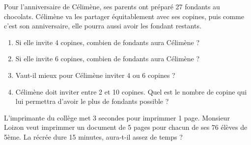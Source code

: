 \newpage


Pour l'anniversaire de Célimène, ses parents ont préparé 27 fondants au chocolats. Célimène va les partager équitablement avec ses copines, puis comme c'est son anniversaire, elle pourra aussi avoir les fondant restants.

\begin{enumerate}
	\item Si elle invite 4 copines, combien de fondants aura Célimène ?
	\item Si elle invite 6 copines, combien de fondants aura Célimène ?
	\item Vaut-il mieux pour Célimène inviter 4 ou 6 copines ?\dotfill
	\item Célimène doit inviter entre 2 et 10 copines. Quel est le nombre de copine qui lui permettra d'avoir le plus de fondants possible ?
\end{enumerate}


L'imprimante du collège met 3 secondes pour imprimmer 1 page. Monsieur Loizon veut imprimmer un document de 5 pages pour chacun de ses 76 élèves de 5ème. La récrée dure 15 minutes, aura-t-il assez de temps ? 
